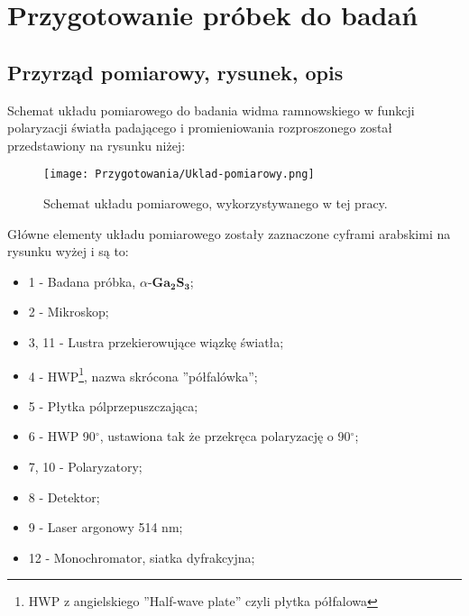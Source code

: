 \newpage

\section{Przygotowanie próbek do badań}

\subsection{Przyrząd pomiarowy, rysunek, opis}
Schemat układu pomiarowego do badania widma ramnowskiego w funkcji polaryzacji światła padającego i promieniowania rozproszonego został przedstawiony na rysunku niżej:
\begin{figure}[H]
	\begin{center}
		\texttt{[image: Przygotowania/Uklad-pomiarowy.png]}
		\caption{Schemat układu pomiarowego, wykorzystywanego w tej pracy.}
	\end{center}
\end{figure}
Główne elementy układu pomiarowego zostały zaznaczone cyframi arabskimi na rysunku wyżej i są to:
\begin{itemize}
	\item 1 - Badana próbka, $\alpha$-$\mathbf{Ga_{2}S_{3}}$;
	\item 2 - Mikroskop;
	\item 3, 11 - Lustra przekierowujące wiązkę światła;
	\item 4 - HWP\footnote{HWP z angielskiego ''Half-wave plate'' czyli  płytka półfalowa}, nazwa skrócona ''półfalówka'';
	\item 5 - Płytka pólprzepuszczająca;
	\item 6 - HWP 90$^{\circ}$, ustawiona tak że przekręca polaryzację o 90$^{\circ}$;
	\item 7, 10 - Polaryzatory;
	\item 8 - Detektor;
	\item 9 - Laser argonowy 514 nm;
	\item 12 - Monochromator, siatka dyfrakcyjna;
\end{itemize}

